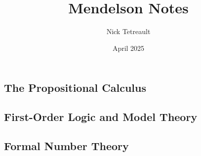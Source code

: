 \documentclass[11pt]{article}
\title{Mendelson Notes}
\author{Nick Tetreault}
\date{April 2025}
\begin{document}
\maketitle

\begin{center}
  \section{The Propositional Calculus}
\end{center}





% 
% 
% 
% 
% 
% 
% 


\newpage
\begin{center}
  \section{First-Order Logic and Model Theory}
\end{center}


















\newpage
\begin{center}
  \section{Formal Number Theory}
\end{center}







% 
% 
% 
\end{document}
